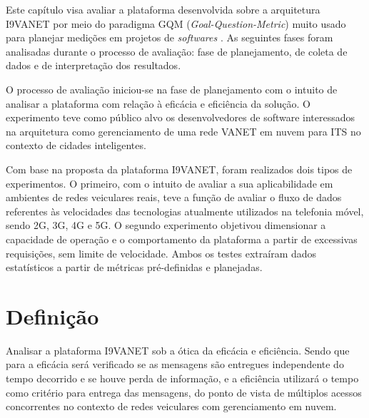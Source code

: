 \documentclass[
	12pt,				%
	oneside,			%
	a4paper,			%
	english,			%
	brazil				%
	]{abntex2ppgsi}
\begin{document}

Este capítulo visa avaliar a plataforma desenvolvida sobre a arquitetura I9VANET  por meio do paradigma GQM (\textit{Goal-Question-Metric}) muito usado para planejar medições em projetos de \textit{softwares} \cite{van2002goal}. As seguintes fases foram analisadas durante o processo de avaliação: fase de planejamento, de coleta de dados e de interpretação dos resultados.

O processo de avaliação iniciou-se na fase de planejamento com o intuito de analisar a plataforma com relação à eficácia e eficiência da solução. O experimento teve como público alvo os desenvolvedores de software interessados na arquitetura como gerenciamento de uma rede VANET em nuvem para ITS no contexto de cidades inteligentes.

Com base na proposta da plataforma I9VANET, foram realizados dois tipos de experimentos. O primeiro, com o intuito de avaliar a sua aplicabilidade em ambientes de redes veiculares reais, teve a função de avaliar o fluxo de dados referentes às velocidades das tecnologias atualmente utilizados na telefonia móvel, sendo 2G, 3G, 4G e 5G. O segundo experimento objetivou dimensionar a capacidade de operação e o comportamento da plataforma a partir de excessivas requisições, sem limite de velocidade. Ambos os testes extraíram dados estatísticos a partir de métricas pré-definidas e planejadas.

\section{Definição}

Analisar a plataforma I9VANET  sob a ótica da eficácia e eficiência. Sendo que para a eficácia será verificado se as mensagens são entregues independente do tempo decorrido e se houve perda de informação, e a eficiência utilizará o tempo como critério para entrega das mensagens, do ponto de vista de múltiplos acessos concorrentes no contexto de redes veiculares com gerenciamento em nuvem. 

\end{document}
